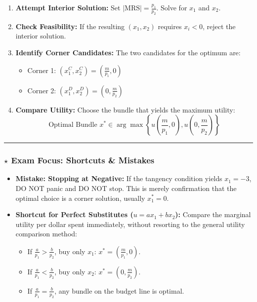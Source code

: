 \documentclass{article}
\begin{document}
\begin{enumerate}
    \item \textbf{Attempt Interior Solution:} Set $|\text{MRS}| = \frac{p_1}{p_2}$. Solve for $x_1$ and $x_2$.
    \item \textbf{Check Feasibility:} If the resulting $(x_1, x_2)$ requires $x_i < 0$, reject the interior solution.
    \item \textbf{Identify Corner Candidates:} The two candidates for the optimum are:
    \begin{itemize}
        \item Corner 1: $(x_1^C, x_2^C) = (\frac{m}{p_1}, 0)$
        \item Corner 2: $(x_1^D, x_2^D) = (0, \frac{m}{p_2})$
    \end{itemize}
    \item \textbf{Compare Utility:} Choose the bundle that yields the maximum utility: \[\text{Optimal Bundle } x^* \in \arg\max \left\{ u\left(\frac{m}{p_1}, 0\right), u\left(0, \frac{m}{p_2}\right) \right\}\]
\end{enumerate}

\noindent\rule{\linewidth}{0.4pt}

\subsubsection*{$\star$ Exam Focus: Shortcuts \& Mistakes}

\begin{itemize}
    \item \textbf{Mistake: Stopping at Negative:} If the tangency condition yields $x_1=-3$, DO NOT panic and DO NOT stop. This is merely confirmation that the optimal choice is a corner solution, usually $x_1^*=0$.
    \item \textbf{Shortcut for Perfect Substitutes ($u=ax_1 + bx_2$):} Compare the marginal utility per dollar spent immediately, without resorting to the general utility comparison method:
    \begin{itemize}
        \item If $\frac{a}{p_1} > \frac{b}{p_2}$, buy only $x_1$: $x^* = (\frac{m}{p_1}, 0)$.
        \item If $\frac{a}{p_1} < \frac{b}{p_2}$, buy only $x_2$: $x^* = (0, \frac{m}{p_2})$.
        \item If $\frac{a}{p_1} = \frac{b}{p_2}$, any bundle on the budget line is optimal.
    \end{itemize}
\end{itemize}
\end{document}

